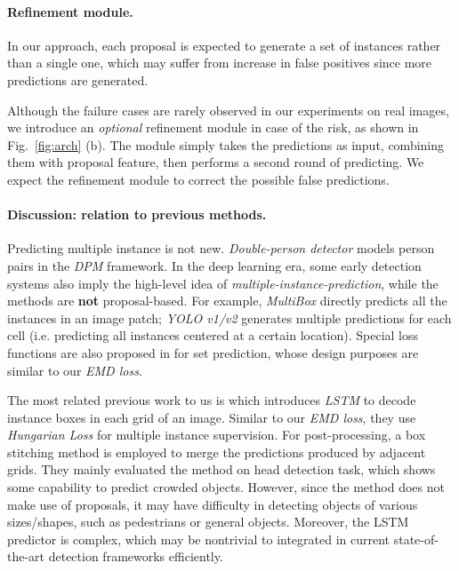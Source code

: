 \documentclass[10pt,twocolumn,letterpaper]{article}
\begin{document}
\paragraph{Refinement module. }
In our approach, each proposal is expected to generate a set of instances rather than a single one, which may suffer from increase in false positives since more predictions are generated. 

Although the failure cases are rarely observed in our experiments on real images, we introduce an \emph{optional} refinement module in case of the risk, as shown in Fig.~\ref{fig:arch} (b). The module simply takes the predictions as input, combining them with proposal feature, then performs a second round of predicting. We expect the refinement module to correct the possible false predictions. 

\paragraph{Discussion: relation to previous methods.  }
Predicting multiple instance is not new. \emph{Double-person detector} \cite{Tang2014}  models person pairs in the \emph{DPM} \cite{felzenszwalb2009object} framework. In the deep learning era, some early detection systems \cite{yolo,redmon2017yolo9000,szegedy2014scalable,erhan2014scalable} also imply the high-level idea of \emph{multiple-instance-prediction}, while the methods are \textbf{not} proposal-based. For example, \emph{MultiBox} \cite{erhan2014scalable,szegedy2014scalable} directly predicts all the instances in an image patch; \emph{YOLO v1/v2} \cite{yolo,redmon2017yolo9000} generates multiple predictions for each cell (i.e. predicting all instances centered at a certain location). Special loss functions are also proposed in \cite{erhan2014scalable,szegedy2014scalable,yolo,redmon2017yolo9000} for set prediction, whose design purposes are similar to our \emph{EMD loss}. 

The most related previous work to us is \cite{stewart2016end} which introduces \emph{LSTM} to decode instance boxes in each grid of an image. Similar to our \emph{EMD loss}, they use \emph{Hungarian Loss} for multiple instance supervision. For post-processing, a box stitching method is employed to merge the predictions produced by adjacent grids. They mainly evaluated the method on head detection task, which shows some capability to predict crowded objects. However, since the method does not make use of proposals, it may have difficulty in detecting objects of various sizes/shapes, such as pedestrians or general objects. Moreover, the LSTM predictor is complex, which may be nontrivial to integrated in current state-of-the-art detection frameworks \cite{lin2017feature,lin2017focal,he2017mask} efficiently. 
\end{document}
